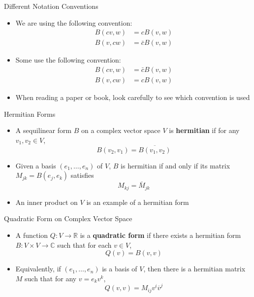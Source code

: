 \documentclass[usenames,dvipsnames,10pt]{beamer}
\newcommand\C{\mathbb{C}}
\newcommand{\R}{\mathbb{R}}
\begin{document}
\begin{frame}
  {Different Notation Conventions}

  \begin{itemize}
  \item We are using the following convention:
    \begin{align*}
      B(cv,w) &= cB(v,w)\\
      B(v,cw) &= \bar{c}B(v,w)
    \end{align*}
  \item Some use the following convention:
    \begin{align*}
      B(cv,w) &= \bar{c}B(v,w)\\
      B(v,cw) &= cB(v,w)
    \end{align*}
  \item When reading a paper or book, look carefully to see which convention is used
  \end{itemize}
\end{frame}

\begin{frame}
  {Hermitian Forms}

  \begin{itemize}
  \item A sequilinear form $B$ on a complex vector space $V$ is {\bf hermitian} if for any $v_1, v_2 \in V$,
    \[ B(v_2,v_1) = \overline{B(v_1,v_2)} \]
  \item Given a basis $(e_1, \dots, e_n)$ of $V$, $B$ is hermitian if and only if its matrix $M_{jk} = B(e_j,e_k)$ satisfies
    \[
      M_{kj} = \bar{M}_{jk}
    \]
  \item An inner product on $V$ is an example of a hermitian form
  \end{itemize}
\end{frame}

\begin{frame}
  {Quadratic Form on Complex Vector Space}

  \begin{itemize}
  \item A function $Q: V \rightarrow \R$ is a {\bf quadratic form} if there exists a hermitian form $B: V\times V\rightarrow \C$ such that for each $v \in V$,
    \[
      Q(v) = B(v,v)
    \]
  \item Equivalently, if $(e_1, \dots, e_n)$ is a basis of $V$, then
    there is a hermitian matrix $M$ such that for any $v = e_kv^k$,
    \[ Q(v,v) = M_{ij}v^i\overline{v}^j \]
  \end{itemize}
\end{frame}
\end{document}

